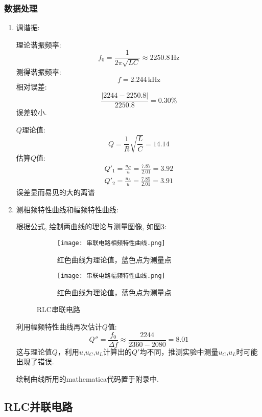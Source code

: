 \documentclass[11pt]{article}
\newcommand{\unit}[1]{\,\mathrm{#1}}
\begin{document}
\subsubsection{数据处理}
\begin{enumerate}
	
	\item 调谐振:
	
	理论谐振频率:
	\[
	f_0 = \frac{1}{2\pi\sqrt{LC}} \approx 2250.8 \unit{Hz} 
	\]
	测得谐振频率:
	\[f=2.244\unit{kHz}\]
	相对误差:
	\[
	\frac{|2244-2250.8|}{2250.8} = 0.30\%
	\]
	误差较小.
	
	$Q$理论值:
	\[
	Q = \frac{1}{R}\sqrt{\frac{L}{C}} = 14.14
	\]
	估算$Q$值:
	\begin{gather*}
		Q'_1 = \frac{u_C}{u} = \frac{7.87}{2.01} = 3.92\\
		Q'_2 = \frac{u_L}{u} = \frac{7.85}{2.01} = 3.91
	\end{gather*}
	误差显而易见的大的离谱
	
	\item 测相频特性曲线和幅频特性曲线:
	
	根据公式, 绘制两曲线的理论与测量图像, 如图\ref{fig:series}:
	
	\begin{figure}[htbp]
		\centering
		\begin{subfigure}[t]{0.45\textwidth}  %
			\centering
			\texttt{[image: 串联电路相频特性曲线.png]}  %
			\caption{红色曲线为理论值，蓝色点为测量点}
			\label{fig:series phase}
		\end{subfigure}
		\begin{subfigure}[t]{0.45\textwidth}  %
			\centering
			\texttt{[image: 串联电路幅频特性曲线.png]}  %
			\caption{红色曲线为理论值，蓝色点为测量点}
			\label{fig:series amplitutde}
		\end{subfigure}
		\caption{RLC串联电路}
		\label{fig:series}
	\end{figure}
	
	利用幅频特性曲线再次估计$Q$值:
	\[
	Q'' = \frac{f_0}{\Delta f} \approx \frac{2244}{2360-2080}=8.01
	\]
	这与理论值$Q$，利用$u$,$u_C$,$u_L$计算出的$Q'$均不同，推测实验中测量$u_C$,$u_L$时可能出现了错误.
	
	绘制曲线所用的mathematica代码置于附录中.
	
\end{enumerate}
	
\subsection{RLC并联电路}
	
\end{document}
